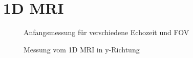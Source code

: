 \section{1D MRI}
\begin{figure}[H]
    \centering
    
    \caption{Anfangsmessung für verschiedene Echozeit und FOV}
\end{figure}

\begin{figure}[H]
    \centering
    
    \caption{Messung vom 1D MRI in y-Richtung}
\end{figure} 